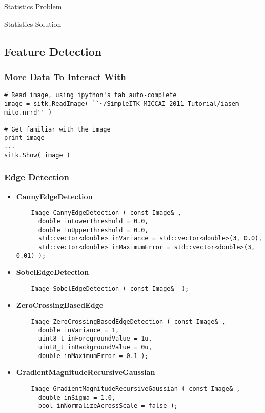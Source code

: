 \begin{frame}{Statistics Problem}
\end{frame}

\begin{frame}{Statistics Solution}
\end{frame}


%
%

\subsection{Feature Detection}


\begin{frame}[fragile]
\frametitle{More Data To Interact With}
\lstpython
\begin{lstlisting}
# Read image, using ipython's tab auto-complete
image = sitk.ReadImage( ``~/SimpleITK-MICCAI-2011-Tutorial/iasem-mito.nrrd'' )

# Get familiar with the image
print image
...
sitk.Show( image )
\end{lstlisting}
\end{frame}

\begin{frame}[fragile]
\frametitle{Edge Detection} 

\begin{itemize}
  \item {\bf CannyEdgeDetection}
\begin{lstlisting}
    Image CannyEdgeDetection ( const Image& ,
      double inLowerThreshold = 0.0,
      double inUpperThreshold = 0.0,
      std::vector<double> inVariance = std::vector<double>(3, 0.0),
      std::vector<double> inMaximumError = std::vector<double>(3, 0.01) );
\end{lstlisting}
  \item {\bf SobelEdgeDetection }
\begin{lstlisting}
    Image SobelEdgeDetection ( const Image&  );
\end{lstlisting}
  \item {\bf ZeroCrossingBasedEdge }
\begin{lstlisting}
    Image ZeroCrossingBasedEdgeDetection ( const Image& ,
      double inVariance = 1,
      uint8_t inForegroundValue = 1u,
      uint8_t inBackgroundValue = 0u,
      double inMaximumError = 0.1 );
\end{lstlisting}
  \item {\bf GradientMagnitudeRecursiveGaussian }
\begin{lstlisting}
    Image GradientMagnitudeRecursiveGaussian ( const Image& ,
      double inSigma = 1.0,
      bool inNormalizeAcrossScale = false );
\end{lstlisting}
\end{itemize}

\end{frame}


